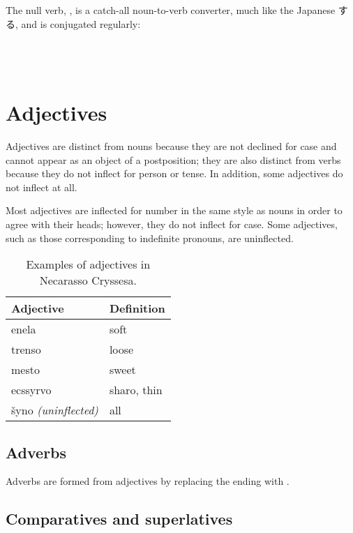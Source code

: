 \documentclass{book}
\begin{document}
The null verb, , is a catch-all noun-to-verb converter, much like the Japanese \textsf{する}, and is conjugated regularly: \\
~\\
    \\
    \\
  

\chapter{Adjectives}

Adjectives are distinct from nouns because they are not declined for case and cannot appear as an object of a postposition; they are also distinct from verbs because they do not inflect for person or tense. In addition, some adjectives do not inflect at all.

Most adjectives are inflected for number in the same style as nouns in order to agree with their heads; however, they do not inflect for case. Some adjectives, such as those corresponding to indefinite pronouns, are uninflected.

\begin{table}[H]
  \caption{Examples of adjectives in Necarasso Cryssesa.}
  \centering
  \begin{tabular}{|l|l|}
    \hline
    Adjective & Definition \\
    \hline
    enela & soft \\
    trenso & loose \\
    mesto & sweet \\
    ecssyrvo & sharo, thin \\
    šyno \emph{(uninflected)} & all \\
    \hline
  \end{tabular}
\end{table}

\section{Adverbs}
\label{sec:adverbs}

Adverbs are formed from adjectives by replacing the ending with .

\section{Comparatives and superlatives}
\end{document}
